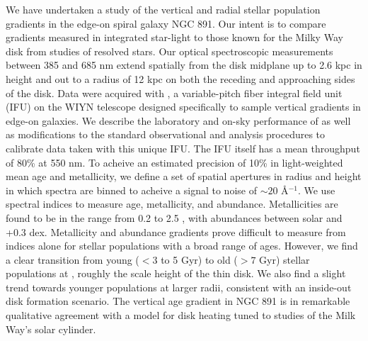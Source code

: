 \begin{chabstract}

We have undertaken a study of the vertical and radial stellar
population gradients in the edge-on spiral galaxy NGC 891. Our intent
is to compare gradients measured in integrated star-light to those
known for the Milky Way disk from studies of resolved stars.  Our
optical spectroscopic measurements between 385 and 685 nm extend
spatially from the disk midplane up to 2.6 kpc in height and out to a
radius of 12 kpc on both the receding and approaching sides of the
disk. Data were acquired with \GP, a variable-pitch fiber integral
field unit (IFU) on the WIYN telescope designed specifically to sample
vertical gradients in edge-on galaxies. We describe the laboratory and
on-sky performance of \GP as well as modifications to the standard
observational and analysis procedures to calibrate data taken with
this unique IFU. The IFU itself has a mean throughput of 80\% at 550
nm. To acheive an estimated precision of 10\% in light-weighted mean
age and metallicity, we define a set of spatial apertures in radius
and height in which spectra are binned to acheive a signal to noise of
$\sim 20$ \AA$^{-1}$. We use spectral indices to measure age,
metallicity, and abundance. Metallicities are found to be in the range
from 0.2 to 2.5 \Zsol, with abundances between solar and +0.3
dex. Metallicity and abundance gradients prove difficult to measure
from indices alone for stellar populations with a broad range of
ages. However, we find a clear transition from young ($<3$ to 5 Gyr) to
old ($> 7$ Gyr) stellar populations at , roughly the
scale height of the thin disk. We also find a slight trend towards
younger populations at larger radii, consistent with an inside-out
disk formation scenario.  The vertical age gradient in NGC 891 is in
remarkable qualitative agreement with a model for disk heating tuned
to studies of the Milk Way's solar cylinder.


\end{chabstract}
\cleardoublepage

